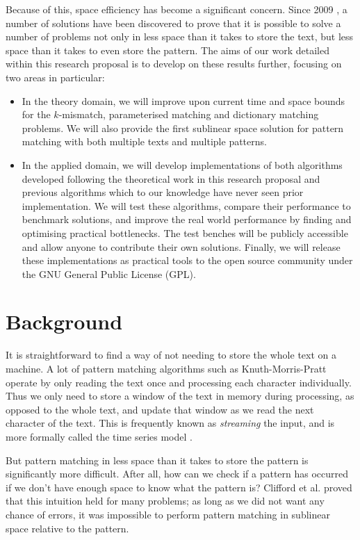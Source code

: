 \documentclass[a4paper,11pt]{article}
\begin{document}
    Because of this, space efficiency has become a significant concern. Since 2009 \cite{5438620}, a number of solutions have been discovered to prove that it is possible to solve a number of problems not only in less space than it takes to store the text, but less space than it takes to even store the pattern. The aims of our work detailed within this research proposal is to develop on these results further, focusing on two areas in particular:

    \begin{itemize}
        \item In the theory domain, we will improve upon current time and space bounds for the $k$-mismatch, parameterised matching and dictionary matching problems. We will also provide the first sublinear space solution for pattern matching with both multiple texts and multiple patterns.
        \item In the applied domain, we will develop implementations of both algorithms developed following the theoretical work in this research proposal and previous algorithms which to our knowledge have never seen prior implementation. We will test these algorithms, compare their performance to benchmark solutions, and improve the real world performance by finding and optimising practical bottlenecks. The test benches will be publicly accessible and allow anyone to contribute their own solutions. Finally, we will release these implementations as practical tools to the open source community under the GNU General Public License (GPL).
    \end{itemize}

    \section{Background}

    It is straightforward to find a way of not needing to store the whole text on a machine. A lot of pattern matching algorithms such as Knuth-Morris-Pratt \cite{kmp} operate by only reading the text once and processing each character individually. Thus we only need to store a window of the text in memory during processing, as opposed to the whole text, and update that window as we read the next character of the text. This is frequently known as \textit{streaming} the input, and is more formally called the time series model \cite{TCS-002}.

    But pattern matching in less space than it takes to store the pattern is significantly more difficult. After all, how can we check if a pattern has occurred if we don't have enough space to know what the pattern is? Clifford et al.\@ \cite{clifford:black-box} proved that this intuition held for many problems; as long as we did not want any chance of errors, it was impossible to perform pattern matching in sublinear space relative to the pattern.
\end{document}
